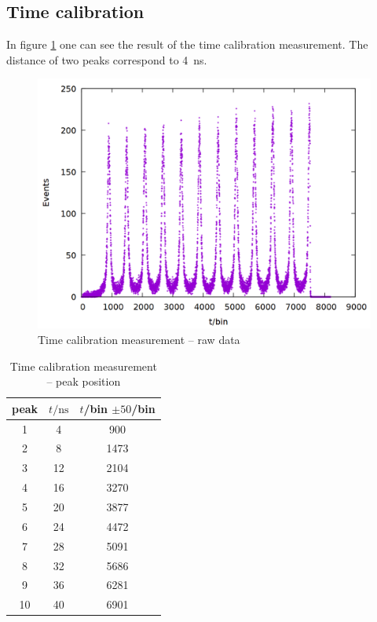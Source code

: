 
\subsection{Time calibration}

In figure \ref{fig:prompt} one can see the result of the time calibration measurement. The distance of two peaks correspond to \si{4\nano \second}.  

\begin{figure}
\centering
\includegraphics[width=0.7\linewidth]{data/prompt/prompt.png}
\caption{Time calibration measurement -- raw data}
\label{fig:prompt}
\end{figure}

\begin{table}
\centering
\caption{Time calibration measurement -- peak position}
\begin{tabular}{ccc}
\toprule
peak & $t/\si{\nano\second}$ & $t$/bin $\pm 50$/bin\\
\midrule
1&	4&	900\\
2&	8&	1473\\
3&	12&	2104\\
4&	16&	3270\\
5&	20&	3877\\
6&	24&	4472\\
7&	28&	5091\\
8&	32&	5686\\
9&	36&	6281\\
10&	40&	6901\\
\bottomrule
\end{tabular}
\label{tab:prompt}
\end{table}

